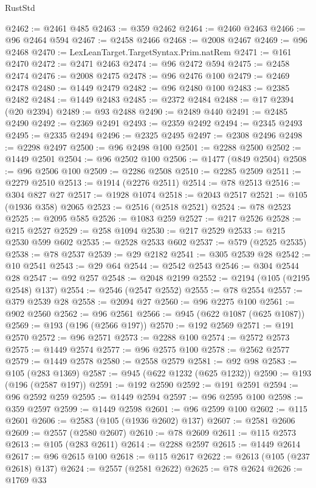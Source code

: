 \begin{lexlean}{RustStd}
\begin{coremodule}
@2462 := @2461 @485
@2463 := @359 @2462
@2464 := @2460 @2463
@2466 := @96 @2464 @594
@2467 := @2458 @2466
@2468 := @2008 @2467
@2469 := @96 @2468
@2470 := LexLeanTarget.TargetSyntax.Prim.natRem
@2471 := @161 @2470
@2472 := @2471 @2463
@2474 := @96 @2472 @594
@2475 := @2458 @2474
@2476 := @2008 @2475
@2478 := @96 @2476 @100
@2479 := @2469 @2478
@2480 := @1449 @2479
@2482 := @96 @2480 @100
@2483 := @2385 @2482
@2484 := @1449 @2483
@2485 := @2372 @2484
@2488 := @17 @2394 (@20 @2394)
@2489 := @93 @2488
@2490 := @2489 @440
@2491 := @2485 @2490
@2492 := @2369 @2491
@2493 := @2359 @2492
@2494 := @2345 @2493
@2495 := @2335 @2494
@2496 := @2325 @2495
@2497 := @2308 @2496
@2498 := @2298 @2497
@2500 := @96 @2498 @100
@2501 := @2288 @2500
@2502 := @1449 @2501
@2504 := @96 @2502 @100
@2506 := @1477 (@849 @2504)
@2508 := @96 @2506 @100
@2509 := @2286 @2508
@2510 := @2285 @2509
@2511 := @2279 @2510
@2513 := @1914 (@2276 @2511)
@2514 := @78 @2513
@2516 := @304 @827 @27
@2517 := @1928 @1074
@2518 := @2043 @2517
@2521 := @105 (@1936 @358) @2065
@2523 := @2516 (@2518 @2521)
@2524 := @78 @2523
@2525 := @2095 @585
@2526 := @1083 @259
@2527 := @217 @2526
@2528 := @215 @2527
@2529 := @258 @1094
@2530 := @217 @2529
@2533 := @215 @2530 @599 @602
@2535 := @2528 @2533 @602
@2537 := @579 (@2525 @2535)
@2538 := @78 @2537
@2539 := @29 @2182
@2541 := @305 @2539 @28
@2542 := @10 @2541
@2543 := @29 @64
@2544 := @2542 @2543
@2546 := @304 @2544 @28
@2547 := @92 @257
@2548 := @2048 @2199
@2552 := @2194 (@105 (@2195 @2548) @137)
@2554 := @2546 (@2547 @2552)
@2555 := @78 @2554
@2557 := @379 @2539 @28
@2558 := @2094 @27
@2560 := @96 @2275 @100
@2561 := @902 @2560
@2562 := @96 @2561
@2566 := @945 (@622 @1087 (@625 @1087))
@2569 := @193 (@196 (@2566 @197))
@2570 := @192 @2569
@2571 := @191 @2570
@2572 := @96 @2571
@2573 := @2288 @100
@2574 := @2572 @2573
@2575 := @1449 @2574
@2577 := @96 @2575 @100
@2578 := @2562 @2577
@2579 := @1449 @2578
@2580 := @2558 @2579
@2581 := @92 @98
@2583 := @105 (@283 @1369)
@2587 := @945 (@622 @1232 (@625 @1232))
@2590 := @193 (@196 (@2587 @197))
@2591 := @192 @2590
@2592 := @191 @2591
@2594 := @96 @2592 @259
@2595 := @1449 @2594
@2597 := @96 @2595 @100
@2598 := @359 @2597
@2599 := @1449 @2598
@2601 := @96 @2599 @100
@2602 := @115 @2601
@2606 := @2583 (@105 (@1936 @2602) @137)
@2607 := @2581 @2606
@2609 := @2557 (@2580 @2607)
@2610 := @78 @2609
@2611 := @115 @2573
@2613 := @105 (@283 @2611)
@2614 := @2288 @2597
@2615 := @1449 @2614
@2617 := @96 @2615 @100
@2618 := @115 @2617
@2622 := @2613 (@105 (@237 @2618) @137)
@2624 := @2557 (@2581 @2622)
@2625 := @78 @2624
@2626 := @1769 @33

\end{coremodule}
\end{lexlean}
